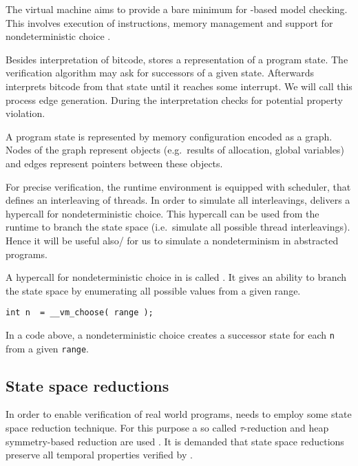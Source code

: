 The \DIVINE virtual machine aims to provide a bare minimum for \LLVM-based model
checking. This involves execution of instructions, memory management and support
for nondeterministic choice \cite{RockaiCB17}.

Besides interpretation of \LLVM bitcode, \DIVM stores a representation of a
program state. The verification algorithm may ask \DIVM for successors of a
given state. Afterwards \DIVM interprets \LLVM bitcode from that state until it
reaches some interrupt. We will call this process edge generation. During
the interpretation \DIVM checks for potential property violation.

A program state is represented by memory configuration encoded as a graph.
Nodes of the graph represent objects (e.g.~results of allocation, global
variables) and edges represent pointers between these objects.

For precise verification, the runtime environment is equipped with scheduler,
that defines an interleaving of threads. In order to simulate all interleavings,
\DIVM delivers a hypercall for nondeterministic choice. This hypercall can be
used from the runtime to branch the state space (i.e.~simulate all possible
thread interleavings). Hence it will be useful also/
for us to simulate a nondeterminism in abstracted programs.

\begin{example}
A hypercall for nondeterministic choice in \DIVM is called .
It gives an ability to branch the state space by enumerating all possible values
from a given range.

\begin{verbatim}
int n  = __vm_choose( range );
\end{verbatim}
\noindent
In a code above, a nondeterministic choice creates a successor state for each
\texttt{n} from a given \texttt{range}.

\end{example}
\subsection{State space reductions}

In order to enable verification of real world programs, \DIVINE needs to employ
some state space reduction technique. For this purpose a so called
$\tau$-reduction and heap symmetry-based reduction are used \cite{Rockai13,
RockaiCB17}.  It is
demanded that state space reductions preserve all temporal properties
verified by \DIVINE.


